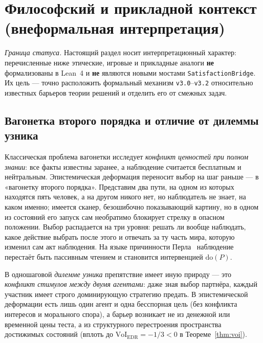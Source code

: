 \documentclass[10pt,a4paper]{article}
\theoremstyle{cleanthm}
\theoremstyle{cleandef}
\begin{document}
\section{Философский и прикладной контекст (внеформальная интерпретация)}

\emph{Граница статуса.} Настоящий раздел носит интерпретационный характер: перечисленные ниже этические, игровые и прикладные аналоги \textbf{не} формализованы в Lean~4 и \textbf{не} являются новыми мостами \texttt{Satisfaction\allowbreak Bridge}. Их цель — точно расположить формальный механизм \texttt{v3.0}--\texttt{v3.2} относительно известных барьеров теории решений и отделить его от смежных задач.

\subsection{Вагонетка второго порядка и отличие от дилеммы узника}

Классическая проблема вагонетки исследует \emph{конфликт ценностей при полном знании}: все факты известны заранее, а наблюдение считается бесплатным и нейтральным. Эпистемическая деформация переносит выбор на шаг раньше — в «вагонетку второго порядка». Представим два пути, на одном из которых находятся пять человек, а на другом никого нет, но наблюдатель не знает, на каком именно; имеется сканер, безошибочно показывающий картину, но в одном из состояний его запуск сам необратимо блокирует стрелку в опасном положении. Выбор распадается на три уровня: решать ли вообще наблюдать, какое действие выбрать после этого и отвечать за ту часть мира, которую изменил сам акт наблюдения. На языке причинности Перла~\cite{pearl2009} наблюдение перестаёт быть пассивным чтением и становится интервенцией $\mathrm{do}(P)$.

В одношаговой \emph{дилемме узника} препятствие имеет иную природу — это \emph{конфликт стимулов между двумя агентами}: даже зная выбор партнёра, каждый участник имеет строго доминирующую стратегию предать. В эпистемической деформации есть лишь один агент и одна бесспорная цель (без конфликта интересов и морального спора), а барьер возникает не из денежной или временной цены теста, а из структурного перестроения пространства достижимых состояний (вплоть до $\mathrm{VoI}_{\mathrm{EDR}}=-1/3<0$ в Теореме~\ref{thm:voi}).
\end{document}
